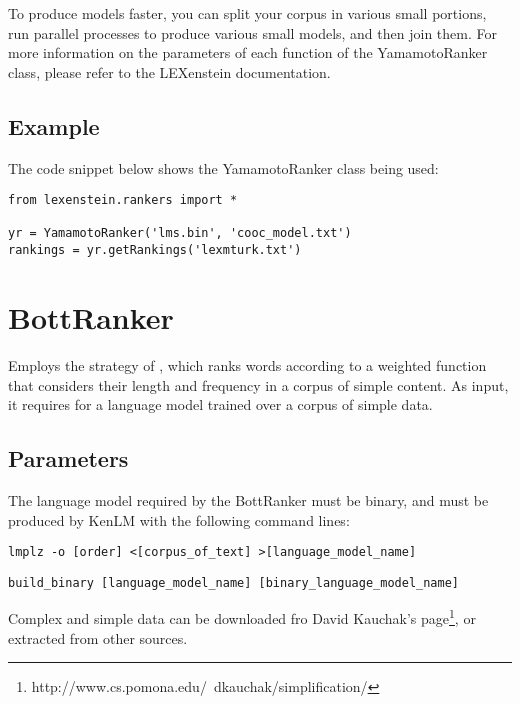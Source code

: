 To produce models faster, you can split your corpus in various small portions, run parallel processes to produce various small models, and then join them. For more information on the parameters of each function of the YamamotoRanker class, please refer to the LEXenstein documentation.

\subsection{Example}

The code snippet below shows the YamamotoRanker class being used:

\begin{lstlisting}
from lexenstein.rankers import *

yr = YamamotoRanker('lms.bin', 'cooc_model.txt')
rankings = yr.getRankings('lexmturk.txt')
\end{lstlisting}















\section{BottRanker}

Employs the strategy of \cite{Bott2012}, which ranks words according to a weighted function that considers their length and frequency in a corpus of simple content. As input, it requires for a language model trained over a corpus of simple data.

\subsection{Parameters}

The language model required by the BottRanker must be binary, and must be produced by KenLM with the following command lines:

\begin{lstlisting}
lmplz -o [order] <[corpus_of_text] >[language_model_name]
\end{lstlisting}
\begin{lstlisting}
build_binary [language_model_name] [binary_language_model_name]
\end{lstlisting}

Complex and simple data can be downloaded fro David Kauchak's page\footnote{http://www.cs.pomona.edu/~dkauchak/simplification/}, or extracted from other sources.

